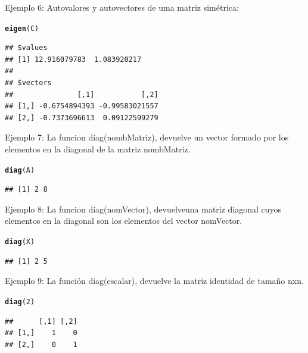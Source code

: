 \documentclass[12pt,letterpaper]{article}\usepackage[]{graphicx}\usepackage[]{color}
\makeatletter
\newcommand{\hlnum}[1]{\textcolor[rgb]{0.686,0.059,0.569}{#1}}%
\newcommand{\hlstd}[1]{\textcolor[rgb]{0.345,0.345,0.345}{#1}}%
\newcommand{\hlkwd}[1]{\textcolor[rgb]{0.737,0.353,0.396}{\textbf{#1}}}%
\newenvironment{kframe}{%
 \def\at@end@of@kframe{}%
 \ifinner\ifhmode%
  \def\at@end@of@kframe{\end{minipage}}%
  \begin{minipage}{\columnwidth}%
 \fi\fi%
 \def\FrameCommand##1{\hskip\@totalleftmargin \hskip-\fboxsep
 \colorbox{shadecolor}{##1}\hskip-\fboxsep
     \hskip-\linewidth \hskip-\@totalleftmargin \hskip\columnwidth}%
 \MakeFramed {\advance\hsize-\width
   \@totalleftmargin\z@ \linewidth\hsize
   \@setminipage}}%
 {\par\unskip\endMakeFramed%
 \at@end@of@kframe}
\newenvironment{knitrout}{}{} %
\makeatother
\begin{document}
Ejemplo 6: Autovalores y autovectores de uma matriz sim\'etrica:
\begin{knitrout}
\color{fgcolor}\begin{kframe}
\begin{alltt}
\hlkwd{eigen}\hlstd{(C)}
\end{alltt}
\begin{verbatim}
## $values
## [1] 12.916079783  1.083920217
## 
## $vectors
##               [,1]           [,2]
## [1,] -0.6754894393 -0.99583021557
## [2,] -0.7373696613  0.09122599279
\end{verbatim}
\end{kframe}
\end{knitrout}

Ejemplo 7: La funcion diag(nombMatriz), devuelve un vector formado por los
elementos en la diagonal de la matriz nombMatriz.
\begin{knitrout}
\color{fgcolor}\begin{kframe}
\begin{alltt}
\hlkwd{diag}\hlstd{(A)}
\end{alltt}
\begin{verbatim}
## [1] 2 8
\end{verbatim}
\end{kframe}
\end{knitrout}

Ejemplo 8: La funcion diag(nomVector), devuelveuna matriz diagonal cuyos elementos en la diagonal son los elementos del vector nomVector. 
\begin{knitrout}
\color{fgcolor}\begin{kframe}
\begin{alltt}
\hlkwd{diag}\hlstd{(X)}
\end{alltt}
\begin{verbatim}
## [1] 2 5
\end{verbatim}
\end{kframe}
\end{knitrout}

Ejemplo 9: La funci\'on diag(escalar), devuelve la matriz identidad de tama\~no nxn.
\begin{knitrout}
\color{fgcolor}\begin{kframe}
\begin{alltt}
\hlkwd{diag}\hlstd{(}\hlnum{2}\hlstd{)}
\end{alltt}
\begin{verbatim}
##      [,1] [,2]
## [1,]    1    0
## [2,]    0    1
\end{verbatim}
\end{kframe}
\end{knitrout}
\end{document}
